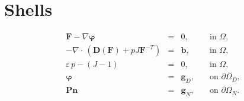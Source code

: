 \documentclass[11pt]{article}
\begin{document}
\section{Shells}

\begin{equation}
\label{eq1}
\begin{array}{rcll}
{\mathbf{F}} - \nabla  \bm{\varphi} & = & 0, & \quad \mbox{in } \Omega , \\
-\nabla \cdot \, ({\mathbf{D}}(\mathbf{F}) + p  J {\mathbf{F}}^{-T})   & = & \bm{b}, & \quad \mbox{in } \Omega, \\
\varepsilon \, p - (J-1)  & = & 0,  & \quad \mbox{in } \Omega, \\
\bm{\varphi}  & = & \bm{g}_D, & \quad \mbox{on } \partial \Omega_D, \\
 {\mathbf{P}}  \bm{n} & = & \bm{g}_N, & \quad \mbox{on } \partial \Omega_N.
\end{array}
\end{equation}
\end{document}
